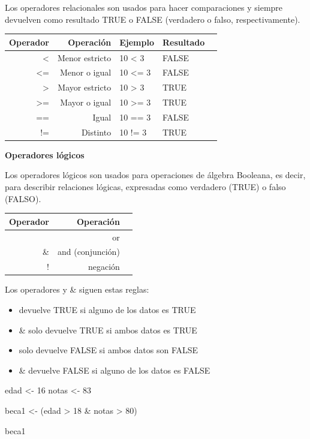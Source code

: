 \documentclass[
  12pt,
]{book}
\newenvironment{Shaded}{\begin{snugshade}}{\end{snugshade}}
\newcommand{\DecValTok}[1]{\textcolor[rgb]{0.00,0.00,0.81}{#1}}
\newcommand{\NormalTok}[1]{#1}
\newcommand{\OtherTok}[1]{\textcolor[rgb]{0.56,0.35,0.01}{#1}}
\newcommand{\SpecialCharTok}[1]{\textcolor[rgb]{0.00,0.00,0.00}{#1}}
\providecommand{\tightlist}{%
  \setlength{\itemsep}{0pt}\setlength{\parskip}{0pt}}
\begin{document}
Los operadores relacionales son usados para hacer comparaciones y siempre devuelven como resultado TRUE o FALSE (verdadero o falso, respectivamente).

\begin{longtable}[]{@{}rrlll@{}}
\toprule
Operador & Operación & Ejemplo & Resultado &\tabularnewline
\midrule
\endhead
\textless{} & Menor estricto & 10 \textless{} 3 & FALSE &\tabularnewline
\textless= & Menor o igual & 10 \textless= 3 & FALSE &\tabularnewline
\textgreater{} & Mayor estricto & 10 \textgreater{} 3 & TRUE &\tabularnewline
\textgreater= & Mayor o igual & 10 \textgreater= 3 & TRUE &\tabularnewline
== & Igual & 10 == 3 & FALSE &\tabularnewline
!= & Distinto & 10 != 3 & TRUE &\tabularnewline
\bottomrule
\end{longtable}

\textbf{Operadores lógicos}

Los operadores lógicos son usados para operaciones de álgebra Booleana, es decir, para describir relaciones lógicas, expresadas como verdadero (TRUE) o falso (FALSO).

\begin{longtable}[]{@{}rrl@{}}
\toprule
Operador & Operación &\tabularnewline
\midrule
\endhead
\textbar{} & or &\tabularnewline
\& & and (conjunción) &\tabularnewline
! & negación &\tabularnewline
\bottomrule
\end{longtable}

Los operadores \textbar{} y \& siguen estas reglas:

\begin{itemize}
\tightlist
\item
  \textbar{} devuelve TRUE si alguno de los datos es TRUE
\item
  \& solo devuelve TRUE si ambos datos es TRUE
\item
  \textbar{} solo devuelve FALSE si ambos datos son FALSE
\item
  \& devuelve FALSE si alguno de los datos es FALSE
\end{itemize}

\begin{Shaded}
\begin{Highlighting}[]
\NormalTok{edad }\OtherTok{\textless{}{-}} \DecValTok{16}
\NormalTok{notas }\OtherTok{\textless{}{-}} \DecValTok{83}

\NormalTok{beca1 }\OtherTok{\textless{}{-}}\NormalTok{ (edad }\SpecialCharTok{\textgreater{}} \DecValTok{18} \SpecialCharTok{\&}\NormalTok{ notas }\SpecialCharTok{\textgreater{}} \DecValTok{80}\NormalTok{)}

\NormalTok{beca1}
\end{Highlighting}
\end{Shaded}
\end{document}
